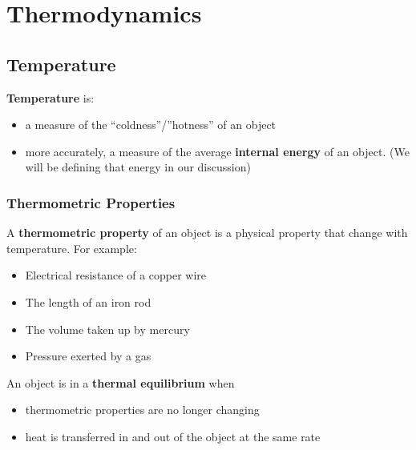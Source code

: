\chapter{Thermodynamics}
\label{chapter:thermodynamics}


\section{Temperature}

\textbf{Temperature} is:
\begin{itemize}
\item a measure of the ``coldness''/''hotness'' of an object
\item more accurately, a measure of the average
  \textbf{internal energy} of an object. (We will be defining that energy
  in our discussion)
\end{itemize}



\subsection{Thermometric Properties}

A \textbf{thermometric property} of an object is a physical property that
change with temperature. For example:
\begin{itemize}
\item Electrical resistance of a copper wire
\item The length of an iron rod
\item The volume taken up by mercury
\item Pressure exerted by a gas
\end{itemize}
An object is in a \textbf{thermal equilibrium} when
\begin{itemize}
\item thermometric properties are no longer changing
\item heat is transferred in and out of the object at the same rate
\end{itemize}



